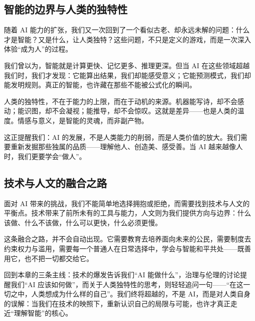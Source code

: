 \subsection*{智能的边界与人类的独特性}

随着 AI 能力的扩张，我们又一次回到了一个看似古老、却永远未解的问题：什么才是智能？又是什么，让人类独特？这些问题，不只是定义的游戏，而是一次深入体验“成为人”的过程。

我们曾以为，智能就是计算更快、记忆更多、推理更深。但当 AI 在这些领域超越我们时，我们才发现：它能算出结果，我们却能感受意义；它能预测模式，我们却能发明规则。真正的智能，也许藏在那些不能被公式化的瞬间。

人类的独特性，不在于能力的上限，而在于动机的来源。机器能写诗，却不会感动；能识图，却不会凝视；能推导，却不会惊叹。这就是差异——也是人类的温度。情感与意义，是智能的灵魂，而非副产物。

这正提醒我们：AI 的发展，不是人类能力的削弱，而是人类价值的放大。我们需要重新发掘那些独属的品质——理解他人、创造美、感受善。当 AI 越来越像人时，我们更要学会“做人”。

\subsection*{技术与人文的融合之路}

面对 AI 带来的挑战，我们不能简单地选择拥抱或拒绝，而需要找到技术与人文的平衡点。技术带来了前所未有的工具与能力，人文则为我们提供方向与边界：什么该做、什么不该做，什么可以更快，什么必须更慢。

这条融合之路，并不会自动出现。它需要教育去培养面向未来的公民，需要制度去约束权力与滥用，需要每一个普通人在日常选择中，学会与智能和平共处——既善用它，也不把一切都交给它。

回到本章的三条主线：技术的爆发告诉我们“AI 能做什么”，治理与伦理的讨论提醒我们“AI 应该如何做”，而关于人类独特性的思考，则轻轻追问一句——“在这一切之中，人类想成为什么样的自己”。我们终将超越的，不是 AI，而是对人类自身的误解：当我们在技术的映照下，重新认识自己的局限与可能，也许才真正走近“理解智能”的核心。